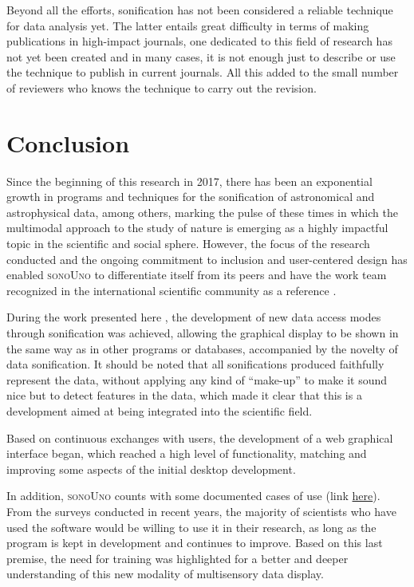 \documentclass[baaa]{baaa}
\begin{document}
Beyond all the efforts, sonification has not been considered a reliable technique for data analysis yet. The latter entails great difficulty in terms of making publications in high-impact journals, one dedicated to this field of research has not yet been created and in many cases, it is not enough just to describe or use the technique to publish in current journals. All this added to the small number of reviewers who knows the technique to carry out the revision.

\section{Conclusion}
\label{sec:conclusion}

Since the beginning of this research in 2017, there has been an exponential growth in programs and techniques for the sonification of astronomical and astrophysical data, among others, marking the pulse of these times in which the multimodal approach to the study of nature is emerging as a highly impactful topic in the scientific and social sphere. However, the focus of the research conducted and the ongoing commitment to inclusion and user-centered design has enabled \textsc{sonoUno} to differentiate itself from its peers and have the work team recognized in the international scientific community as a reference \citep{zanella2022}.

During the work presented here \citep{thesiscasado}, the development of new data access modes through sonification was achieved, allowing the graphical display to be shown in the same way as in other programs or databases, accompanied by the novelty of data sonification. It should be noted that all sonifications produced faithfully represent the data, without applying any kind of ``make-up'' to make it sound nice but to detect features in the data, which made it clear that this is a development aimed at being integrated into the scientific field.

Based on continuous exchanges with users, the development of a web graphical interface began, which reached a high level of functionality, matching and improving some aspects of the initial desktop development.

In addition, \textsc{sonoUno} counts with some documented cases of use (link \href{https://linktr.ee/sonouno.casesofuse}{here}). From the surveys conducted in recent years, the majority of scientists who have used the software would be willing to use it in their research, as long as the program is kept in development and continues to improve. Based on this last premise, the need for training was highlighted for a better and deeper understanding of this new modality of multisensory data display.
\end{document}
